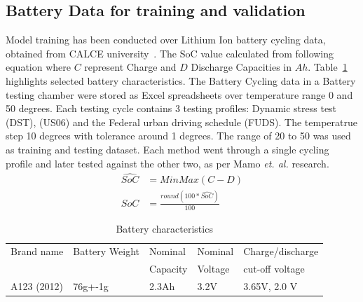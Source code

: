 \subsection{Battery Data for training and validation}
Model training has been conducted over Lithium Ion battery cycling data, obtained from CALCE university~\cite{noauthor_calce_2017}.
The SoC value calculated from following equation where $C$ represent Charge and $D$ Discharge Capacities in $Ah$.
Table~\ref{tab:battery} highlights selected battery characteristics.
The Battery Cycling data in a Battery testing chamber were stored as Excel spreadsheets over temperature range 0 and 50 degrees.
Each testing cycle contains 3 testing profiles: Dynamic stress test (DST), (US06) and the Federal urban driving schedule (FUDS).
The temperatrue step 10 degrees with tolerance around 1 degrees.
The range of 20 to 50 was used as training and testing dataset.
Each method went through a single cycling profile and later tested against the other two, as per Mamo \textit{et. al.} \cite{mamo_long_2020} research.
\begin{equation}
    \begin{split}
        \hat{SoC} &= MinMax(C-D) \\
        SoC &= \frac{round(100*\hat{SoC})}{100}
    \end{split}
\end{equation}
\begin{table}[ht]
    \centering
    \caption{Battery characteristics}
    \label{tab:battery}
    \begin{tabular}{ p{2.7cm} p{2.7cm} p{2.7cm} p{2.7cm} p{2.7cm}   }
        \hline
        Brand name & Battery Weight & Nominal  & Nominal & Charge/discharge\\
                   &                & Capacity & Voltage & cut-off voltage \\
        \hline
        A123 (2012) & 76g+-1g & 2.3Ah & 3.2V & 3.65V, 2.0 V\\
        \hline
    \end{tabular}
\end{table}
